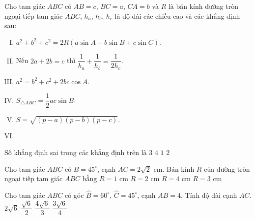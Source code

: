 \begin{ex}%
Cho tam giác $ABC$ có $A B=c$, $BC=a$, $CA=b$ và $R$ là bán kính đường tròn ngoại tiếp tam giác $ABC$, $h_a$, $h_b$, $h_c$ là độ dài các chiều cao và các khẳng định sau:
\begin{multicols}{2}
\begin{enumerate}[I)]
\item  $a^2+b^2+c^2=2 R(a \sin A+b \sin B+c \sin C)$.
\item Nếu $2 a+2 b=c$ thì $\dfrac{1}{h_a}+\dfrac{1}{h_b}=\dfrac{1}{2 h_c}$.
\item $a^2=b^2+c^2+2 b c \cos A$.
\item  $S_{\triangle ABC}=\dfrac{1}{2} a c \sin B$.
\item  $S=\sqrt{(p-a)(p-b)(p-c)}$.
\item[] 
\end{enumerate}
\end{multicols}
\noindent
Số khẳng định sai trong các khẳng định trên là
\choice
{$3$}
{$4$}
{$1$}
{\True $2$}
\end{ex}
\begin{ex}%
Cho tam giác $ABC$ có $B=45^{\circ}$, cạnh $AC=2\sqrt{2}$ cm. Bán kính $R$ của đường tròn ngoại tiếp tam giác $ABC$ bằng
\choice
{$R=1$ cm}
{\True $R=2$ cm}
{$R=4$ cm}
{$R=3$ cm}
\end{ex}
\begin{ex}%
Cho tam giác $ABC$ có góc $\widehat{B}=60^{\circ}$, $\widehat{C}=45^{\circ}$, cạnh $AB=4$. Tính độ dài cạnh $AC$.
\choice
{\True $2\sqrt{6}$}
{$\dfrac{\sqrt{6}}{2}$}
{$\dfrac{4\sqrt{6}}{3}$}
{$\dfrac{3\sqrt{6}}{4}$}
\end{ex}
